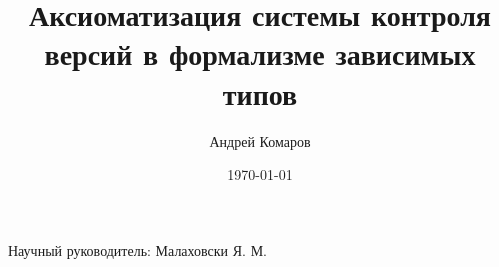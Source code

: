 \documentclass[14pt]{beamer}
\title{Аксиоматизация системы контроля версий в формализме зависимых типов}
\author{Андрей Комаров}
\institute{НИУ ИТМО}
\date{\today}
\begin{document}
{
\begin{frame}
  \maketitle

  \begin{flushright}
    Научный руководитель: Малаховски Я. М.
  \end{flushright}
\end{frame}
}












%

\end{document}
